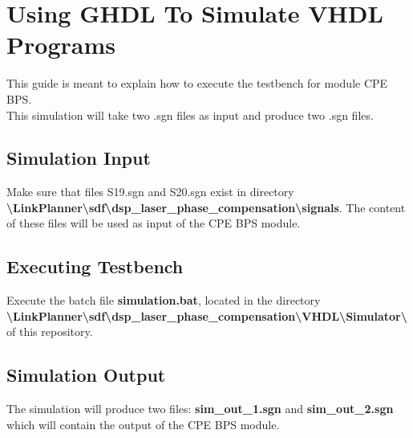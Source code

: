 \section{Using GHDL To Simulate VHDL Programs}
This guide is meant to explain how to execute the testbench for module CPE BPS.\\
This simulation will take two .sgn files as input and produce two .sgn files.\\

\subsection{Simulation Input}
Make sure that files S19.sgn and S20.sgn exist in directory \textbf{\textbackslash{}LinkPlanner\textbackslash{}sdf\textbackslash{}dsp\_laser\_phase\_compensation\textbackslash{}signals}. The content of these files will be used as input of the CPE BPS module.

\subsection{Executing Testbench}
Execute the batch file \textbf{simulation.bat}, located in the directory \textbf{\textbackslash{}LinkPlanner\textbackslash{}sdf\textbackslash{}dsp\_laser\_phase\_compensation\textbackslash{}VHDL\textbackslash{}Simulator\textbackslash{}} of this repository.

\subsection{Simulation Output}
The simulation will produce two files: \textbf{sim\_out\_1.sgn} and \textbf{sim\_out\_2.sgn} which will contain the output of the CPE BPS module.
